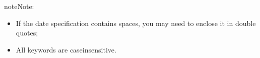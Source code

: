 \documentclass[letterpaper,10pt,english]{sphinxmanual}
\begin{document}
\begin{sphinxadmonition}{note}{Note:}\begin{itemize}
\item {} 
\sphinxAtStartPar
If the date specification contains spaces, you may need to
enclose it in double quotes;

\item {} 
\sphinxAtStartPar
All keywords are case\sphinxhyphen{}insensitive.

\end{itemize}
\end{sphinxadmonition}



\renewcommand{\indexname}{Index}
\printindex
\end{document}
